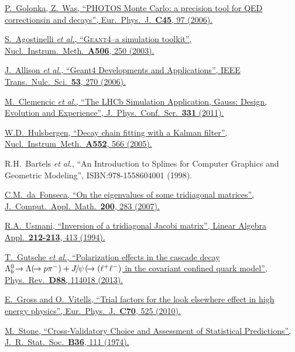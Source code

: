 {\begin{thebibliography}{xxx}
	\href{https://doi.org/10.1140/epjc/s2005-02396-4}{P.~Golonka, Z.~Was, \enquote{PHOTOS Monte Carlo: a precision tool for QED correctionsin \PZ and \PW decays}, Eur.\ Phys.\ J.\ \textbf{C45}, 97 (2006).}

	\href{https://doi.org/10.1016/S0168-9002(03)01368-8}{S.~Agostinelli \textit{et al.}, \enquote{\textsc{Geant4}--a simulation toolkit}, Nucl.\ Instrum.\ Meth.\ \textbf{A506}, 250 (2003).}

	\href{https://doi.org/10.1109/TNS.2006.869826}{J.~Allison \textit{et al.}, \enquote{Geant4 Developments and Applications}, IEEE Trans.\ Nulc.\ Sci.\ \textbf{53}, 270 (2006).}

	\href{https://doi.org/10.1088/1742-6596/331/3/032023}{M.~Clemencic \textit{et al.}, \enquote{The LHCb Simulation Application, Gauss: Design, Evolution and Experience}, J.\ Phys.\ Conf.\ Ser.\ \textbf{331} (2011).}

	\href{https://doi.org/10.1016/j.nima.2005.06.078}{W.D.~Hulsbergen, \enquote{Decay chain fitting with a Kalman filter}, Nucl.\ Instrum\ Meth.\ \textbf{A552}, 566 (2005).}

	R.H.~Bartels \textit{et al.}, \enquote{An Introduction to Splines for Computer Graphics and Geometric Modeling}, ISBN:978-1558604001 (1998).

	\href{https://doi.org/10.1016/j.cam.2005.08.047}{C.M.~da~Fonseca, \enquote{On the eigenvalues of some tridiagonal matrices}, J.\ Comput.\ Appl.\ Math.\ \textbf{200}, 283 (2007).}

	\href{https://doi.org/10.1016/0024-3795(94)90414-6}{R.A.~Usmani, \enquote{Inversion of a tridiagonal Jacobi matrix}, Linear Algebra Appl.\ \textbf{212-213}, 413 (1994).}

	\href{https://doi.org/10.1103/PhysRevD.88.114018}{T.~Gutsche \textit{et al.}, \enquote{Polarization effects in the cascade decay ${{\Lambda}^0_{b}}\!\rightarrow{\ensuremath{\Lambda}}(\!\rightarrow{\ensuremath{p}}{\ensuremath{{\pi}^-}}) + {{J\mskip -3mu/\mskip -2mu\psi\mskip 2mu}}(\!\rightarrow({\ell^+}{\ell^-})$ in the covariant confined quark model}, Phys.\ Rev.\ \textbf{D88}, 114018 (2013).}

	\href{https://doi.org/10.1140/epjc/s10052-010-1470-8}{E.~Gross and O.~Vitells, \enquote{Trial factors for the look elsewhere effect in high energy physics}, Eur.\ Phys.\ J.\ \textbf{C70}, 525 (2010).}

	\href{http://www.jstor.org/stable/2984809}{M.~Stone, \enquote{Cross-Validatory Choice and Assessment of Statistical Predictions}, J.\ R.\ Stat.\ Soc.\ \textbf{B36}, 111 (1974).}


\end{thebibliography}}
